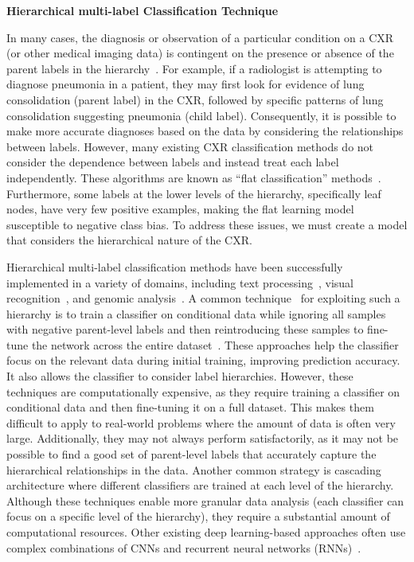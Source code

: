 \documentclass[preprint,3p,times, review]{elsarticle}
\begin{document}
\textbf{Hierarchical multi-label Classification Technique}

In many cases, the diagnosis or observation of a particular condition on a CXR (or other medical imaging data) is contingent on the presence or absence of the parent labels in the hierarchy~\cite{1902693:27875850}. For example, if a radiologist is attempting to diagnose pneumonia in a patient, they may first look for evidence of lung consolidation (parent label) in the CXR, followed by specific patterns of lung consolidation suggesting pneumonia (child label). Consequently, it is possible to make more accurate diagnoses based on the data by considering the relationships between labels. However, many existing CXR classification methods do not consider the dependence between labels and instead treat each label independently. These algorithms are known as ``flat classification'' methods~\cite{1902693:27875863}. Furthermore, some labels at the lower levels of the hierarchy, specifically leaf nodes, have very few positive examples, making the flat learning model susceptible to negative class bias. To address these issues, we must create a model that considers the hierarchical nature of the CXR\@.

Hierarchical multi-label classification methods have been successfully implemented in a variety of domains, including text processing~\cite{1902693:27875833}, visual recognition~\cite{1902693:27875826}, and genomic analysis~\cite{1902693:27875843}. A common technique~\cite{1902693:27875835} for exploiting such a hierarchy is to train a classifier on conditional data while ignoring all samples with negative parent-level labels and then reintroducing these samples to fine-tune the network across the entire dataset~\cite{1902693:27875835}. These approaches help the classifier focus on the relevant data during initial training, improving prediction accuracy. It also allows the classifier to consider label hierarchies. However, these techniques are computationally expensive, as they require training a classifier on conditional data and then fine-tuning it on a full dataset. This makes them difficult to apply to real-world problems where the amount of data is often very large. Additionally, they may not always perform satisfactorily, as it may not be possible to find a good set of parent-level labels that accurately capture the hierarchical relationships in the data. Another common strategy is cascading architecture where different classifiers are trained at each level of the hierarchy. Although these techniques enable more granular data analysis (each classifier can focus on a specific level of the hierarchy), they require a substantial amount of computational resources. Other existing deep learning-based approaches often use complex combinations of CNNs and recurrent neural networks (RNNs)~\cite{1902693:27875822,1902693:27875852}.
\end{document}
